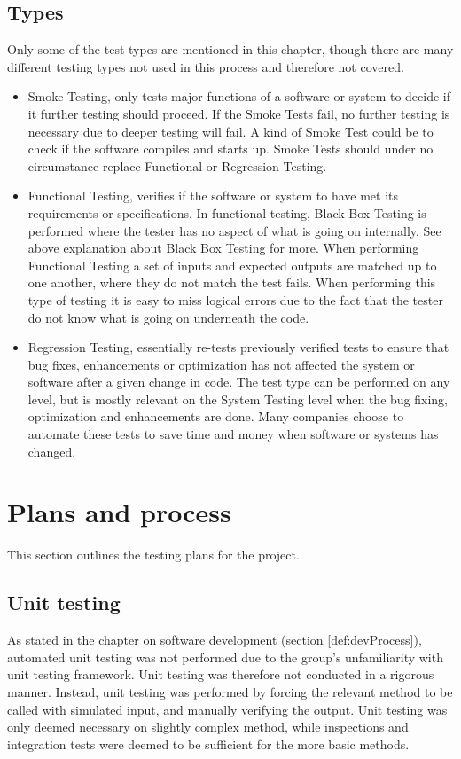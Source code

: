 \subsection{Types}
Only some of the test types are mentioned in this chapter, though there are many different testing types not used in this process and therefore not covered.
\begin{itemize}
\item Smoke Testing, only tests major functions of a software or system to decide if it further testing should proceed. If the Smoke Tests fail, no further testing is necessary due to deeper testing will fail. A kind of Smoke Test could be to check if the software compiles and starts up. Smoke Tests should under no circumstance replace Functional or Regression Testing.
\item Functional Testing, verifies if the software or system to have met its requirements or specifications. In functional testing, Black Box Testing is performed where the tester has no aspect of what is going on internally. See above explanation about Black Box Testing for more. When performing Functional Testing a set of inputs and expected outputs are matched up to one another, where they do not match the test fails. When performing this type of testing it is easy to miss logical errors due to the fact that the tester do not know what is going on underneath the code.
\item Regression Testing, essentially re-tests previously verified tests to ensure that bug fixes, enhancements or optimization has not affected the system or software after a given change in code. The test type can be performed on any level, but is mostly relevant on the System Testing level when the bug fixing, optimization and enhancements are done. Many companies choose to automate these tests to save time and money when software or systems has changed.
\end{itemize}
\section{Plans and process}
This section outlines the testing plans for the project.
\subsection{Unit testing}
As stated in the chapter on software development (section \ref{def:devProcess}), automated unit testing was not performed due to the group's unfamiliarity with unit testing framework. Unit testing was therefore not conducted in a rigorous manner. Instead, unit testing was performed by forcing the relevant method to be called with simulated input, and manually verifying the output. Unit testing was only deemed necessary on slightly complex method, while inspections and integration tests were deemed to be sufficient for the more basic methods.
